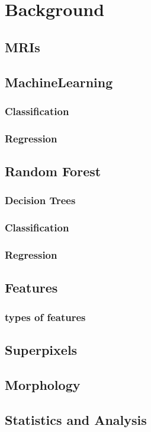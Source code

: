 \chapter{Background}
\section{MRIs}
\section{MachineLearning}
	\subsection{Classification}
	\subsection{Regression}
\section{Random Forest}
		\subsection{Decision Trees}
		\subsection{Classification}
		\subsection{Regression}
\section{Features}
	\subsection{types of features}
\section{Superpixels}
\section{Morphology}
\section{Statistics and Analysis}